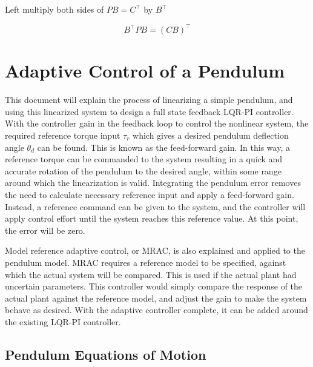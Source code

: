 Left multiply both sides of $PB=C^{\top}$ by $B^{\top}$

\begin{equation*}
  B^{\top}PB=(CB)^{\top}
\end{equation*}

\section{Adaptive Control of a Pendulum}

This document will explain the process of linearizing a simple pendulum, and using this linearized system to design a full state feedback LQR-PI controller.
With the controller gain in the feedback loop to control the nonlinear system, the required reference torque input $\tau_{r}$ which gives a desired pendulum deflection angle $\theta_{d}$ can be found.
This is known as the feed-forward gain.
In this way, a reference torque can be commanded to the system resulting in a quick and accurate rotation of the pendulum to the desired angle, within some range around which the linearization is valid.
Integrating the pendulum error removes the need to calculate necessary reference input and apply a feed-forward gain.
Instead, a reference command can be given to the system, and the controller will apply control effort until the system reaches this reference value.
At this point, the error will be zero.

Model reference adaptive control, or MRAC, is also explained and applied to the pendulum model.
MRAC requires a reference model to be specified, against which the actual system will be compared.
This is used if the actual plant had uncertain parameters.
This controller would simply compare the response of the actual plant against the reference model, and adjust the gain to make the system behave as desired.
With the adaptive controller complete, it can be added around the existing LQR-PI controller.

\subsection{Pendulum Equations of Motion}

